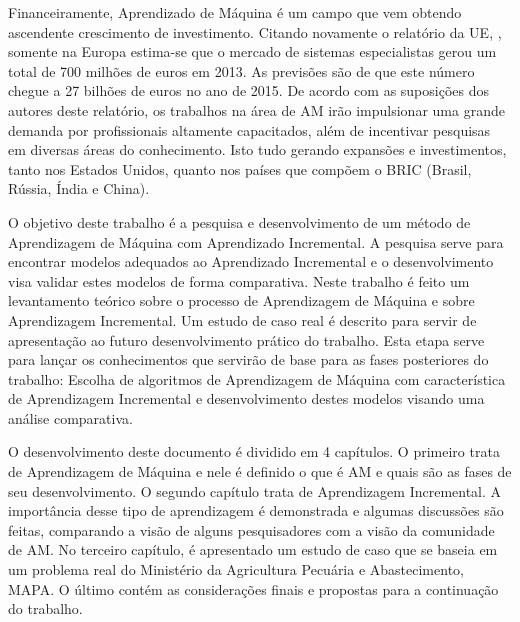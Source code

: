 Financeiramente, Aprendizado de Máquina é um campo que vem obtendo ascendente crescimento de investimento. Citando novamente o relatório da UE, , somente na Europa estima-se que o mercado de sistemas especialistas gerou um total de 700 milhões de euros em 2013. As previsões são de que este número chegue a 27 bilhões de euros no ano de 2015. De acordo com as suposições dos autores deste relatório, os trabalhos na área de AM irão impulsionar uma grande demanda por profissionais altamente capacitados, além de incentivar pesquisas em diversas áreas do conhecimento. Isto tudo gerando expansões e investimentos, tanto nos Estados Unidos, quanto nos países que compõem o BRIC (Brasil, Rússia, Índia e China). 

O objetivo deste trabalho é a pesquisa e desenvolvimento de um método de Aprendizagem de Máquina com Aprendizado Incremental. A pesquisa serve para encontrar modelos adequados ao Aprendizado Incremental e o desenvolvimento visa validar estes modelos de forma comparativa. Neste trabalho é feito um levantamento teórico sobre o processo de Aprendizagem de Máquina e sobre Aprendizagem Incremental. Um estudo de caso real é descrito para servir de apresentação ao futuro desenvolvimento prático do trabalho. Esta etapa serve para lançar os conhecimentos que servirão de base para as fases posteriores do trabalho: Escolha de algoritmos de Aprendizagem de Máquina com característica de Aprendizagem Incremental e desenvolvimento destes modelos visando uma análise comparativa.

O desenvolvimento deste documento é dividido em 4 capítulos. O primeiro  trata de Aprendizagem de Máquina e nele é definido o que é AM e quais são as fases de seu desenvolvimento. O segundo capítulo trata de Aprendizagem Incremental. A importância desse tipo de aprendizagem é demonstrada e algumas discussões são feitas, comparando a visão de alguns pesquisadores com a visão da comunidade de AM. No terceiro capítulo, é apresentado um estudo de caso que se baseia em um problema real do Ministério da Agricultura Pecuária e Abastecimento, MAPA. O último  contém as considerações finais e propostas para a continuação do trabalho.





